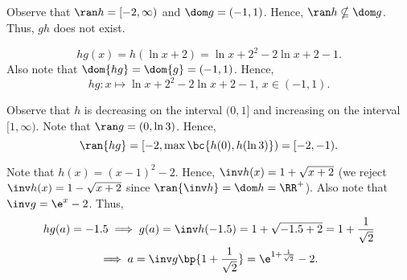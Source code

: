 \begin{solution}
\begin{ppart}
\begin{center}
        \end{center}
    \end{ppart}
    \begin{ppart}
        Observe that $\ran h = [-2, \infty)$ and $\dom g = (-1, 1)$. Hence, $\ran h \nsubseteq \dom g$. Thus, $gh$ does not exist.
    \end{ppart}
    \begin{ppart}
        \[hg(x) = h(\ln{x+2}) = \ln{x+2}^2 - 2\ln{x+2} - 1.\] Also note that $\dom{hg} = \dom{g} = (-1, 1)$. Hence, \[hg \colon x \mapsto \ln{x+2}^2 - 2\ln{x+2} - 1, \, x \in (-1, 1).\]

        Observe that $h$ is decreasing on the interval $(0, 1]$ and increasing on the interval $[1, \infty)$. Note that $\ran g = (0, \ln 3)$. Hence, \[\ran{hg} = [-2, \max \bc{h(0), h(\ln 3)}) = [-2, -1).\]
    \end{ppart}
    \begin{ppart}
        Note that $h(x) = (x-1)^2 -2$. Hence, $\inv h(x) = 1 + \sqrt{x+2}$ (we reject $\inv h(x) = 1 - \sqrt{x+2}$ since $\ran{\inv h} = \dom h = \RR^+$). Also note that $\inv g = \e^x - 2$. Thus,
        \begin{gather*}
            hg(a) = -1.5 \implies g(a) = \inv h(-1.5) = 1 + \sqrt{-1.5 + 2} = 1 + \frac1{\sqrt{2}}\\
            \implies a = \inv g\bp{1 + \frac1{\sqrt{2}}} = \e^{1 + \frac1{\sqrt{2}}} - 2.
        \end{gather*}
    \end{ppart}
\end{solution}


